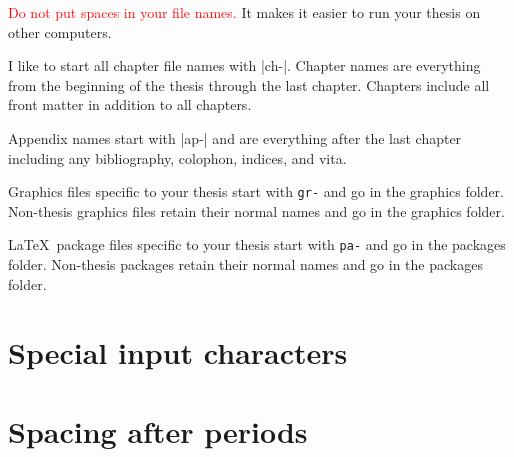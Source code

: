 \textcolor{red}{Do not put spaces in your file names.}
It makes it easier to run your thesis on other computers.
  
I like
to start all chapter file names with |ch-|.
Chapter names are everything
from the beginning of the thesis through the last chapter.
Chapters include all front matter in addition
to all chapters.

Appendix names start with |ap-|
and are everything after the last chapter including any bibliography,
colophon,
indices,
and vita.

Graphics files specific to your thesis start
with \verb+gr-+ and go in the graphics folder.
Non-thesis graphics files retain their normal names
and go in the graphics folder.

\LaTeX\ package files specific to your thesis  start
with \verb+pa-+ and go in the packages folder.
Non-thesis packages retain their normal names
and go in the packages folder.


\section{Special input characters}

\UndefineShortVerb{\|}
\DefineShortVerb{\;}  %
\noindent
{
  \setlength{\tabcolsep}{8.5pt}
}
\UndefineShortVerb{\;}
\DefineShortVerb{\|}  %


\section{Spacing after periods}



